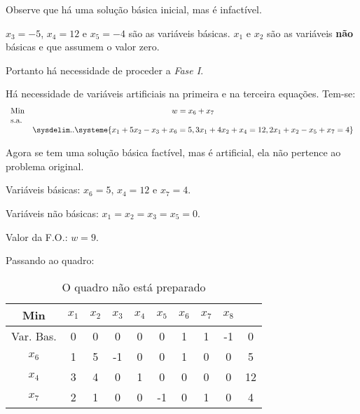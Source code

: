 Observe que há uma solução básica inicial, mas é infactível.

$ x_3 = -5 $, $ x_4 = 12 $ e $ x_5 = -4 $ são as variáveis básicas.
$ x_1 $ e $ x_2 $ são as variáveis \textbf{não} básicas e que assumem o valor
zero.

Portanto há necessidade de proceder a \textit{Fase I}.

Há necessidade de variáveis artificiais na primeira e na terceira equações.
Tem-se:
\[
  \begin{array}{lc}
   \text{Min}  & w = x_6 + x_7  \\
   \text{s.a.} & \\
               & \sysdelim..\systeme
               {
               x_1 + 5x_2 - x_3 + x_6 = 5,
               3x_1 + 4x_2 + x_4 = 12,
               2x_1 + x_2 - x_5 + x_7 = 4
               }
  \end{array}
\]

Agora se tem uma solução básica factível, mas é artificial, ela não pertence ao
problema original.

Variáveis básicas: $ x_6 = 5 $, $ x_4 = 12 $ e $ x_7 = 4 $.

Variáveis não básicas: $ x_1 = x_2 = x_3 = x_5 = 0 $.

Valor da F.O.: $ w = 9 $.

Passando ao quadro:

\begin{table}[!h]
\centering
\caption{O quadro não está preparado}
\begin{tabular}{|c|cccccccc|c|}
  \hline
  Min         & $x_1$ & $x_2$ & $x_3$ & $x_4$ & $x_5$ & $x_6$ & $x_7$ & $x_8$ &    \\
  \hline
  Var. Bas.   &   0   &   0 &   0 &   0 &   0 &   1 &   1 &  -1 &  0 \\
  \hline
  $x_6$       &   1   &   5 &  -1 &   0 &   0 &   1 &   0 &   0 &  5 \\
  $x_4$       &   3   &   4 &   0 &   1 &   0 &   0 &   0 &   0 & 12 \\
  $x_7$       &   2   &   1 &   0 &   0 &  -1 &   0 &   1 &   0 &  4 \\
  \hline
\end{tabular}
\end{table}

